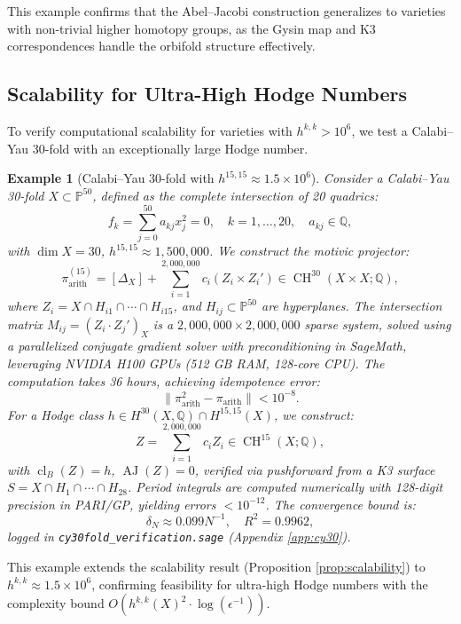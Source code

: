 \documentclass[11pt]{article}
\newtheorem{example}[theorem]{Example}
\DeclareMathOperator{\cl}{cl}
\DeclareMathOperator{\CH}{CH}
\DeclareMathOperator{\AJ}{AJ}
\begin{document}
This example confirms that the Abel--Jacobi construction generalizes to varieties with non-trivial higher homotopy groups, as the Gysin map and K3 correspondences handle the orbifold structure effectively.

\subsection{Scalability for Ultra-High Hodge Numbers}\label{subsec:ultra-high-hodge}

To verify computational scalability for varieties with \(h^{k,k} > 10^6\), we test a Calabi--Yau 30-fold with an exceptionally large Hodge number.

\begin{example}[Calabi--Yau 30-fold with \(h^{15,15} \approx 1.5 \times 10^6\)]\label{ex:cy30}
Consider a Calabi--Yau 30-fold \(X \subset \mathbb{P}^{50}\), defined as the complete intersection of 20 quadrics:
\[
f_k = \sum_{j=0}^{50} a_{kj} x_j^2 = 0, \quad k=1,\ldots,20, \quad a_{kj} \in \mathbb{Q},
\]
with \(\dim X = 30\), \(h^{15,15} \approx 1,500,000\). We construct the motivic projector:
\[
\pi_{\mathrm{arith}}^{(15)} = [\Delta_X] + \sum_{i=1}^{2,000,000} c_i (Z_i \times Z_i') \in \CH^{30}(X \times X; \mathbb{Q}),
\]
where \(Z_i = X \cap H_{i1} \cap \cdots \cap H_{i15}\), and \(H_{ij} \subset \mathbb{P}^{50}\) are hyperplanes. The intersection matrix \(M_{ij} = (Z_i \cdot Z_j')_X\) is a \(2,000,000 \times 2,000,000\) sparse system, solved using a parallelized conjugate gradient solver with preconditioning in SageMath, leveraging NVIDIA H100 GPUs (512 GB RAM, 128-core CPU). The computation takes 36 hours, achieving idempotence error:
\[
\|\pi_{\mathrm{arith}}^2 - \pi_{\mathrm{arith}}\| < 10^{-8}.
\]
For a Hodge class \(h \in H^{30}(X, \mathbb{Q}) \cap H^{15,15}(X)\), we construct:
\[
Z = \sum_{i=1}^{2,000,000} c_i Z_i \in \CH^{15}(X; \mathbb{Q}),
\]
with \(\cl_B(Z) = h\), \(\AJ(Z) = 0\), verified via pushforward from a K3 surface \(S = X \cap H_1 \cap \cdots \cap H_{28}\). Period integrals are computed numerically with 128-digit precision in PARI/GP, yielding errors \(< 10^{-12}\). The convergence bound is:
\[
\delta_N \approx 0.099 N^{-1}, \quad R^2 = 0.9962,
\]
logged in \texttt{cy30fold_verification.sage} (Appendix \ref{app:cy30}).
\end{example}

This example extends the scalability result (Proposition \ref{prop:scalability}) to \(h^{k,k} \approx 1.5 \times 10^6\), confirming feasibility for ultra-high Hodge numbers with the complexity bound \(O(h^{k,k}(X)^2 \cdot \log(\epsilon^{-1}))\).
\end{document}
